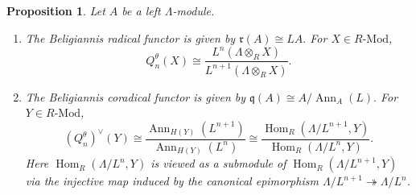 \documentclass[11pt,reqno]{amsart}
\numberwithin{equation}{section}
\newtheorem{proposition}[theorem]{Proposition}
\newcommand{\Hom}{\operatorname{Hom}}
\newcommand{\radf}{\mathfrak r}
\newcommand{\coradf}{\mathfrak q}
\newcommand{\Ann}{\operatorname{Ann}}
\begin{document}
\begin{proposition}\label{prop:theta-layers}
Let $A$ be a left $\Lambda$-module.
\begin{enumerate}[label=\textup{(\arabic*)}]
\item The Beligiannis radical functor is given by
$
\radf(A)\cong LA.
$
For $X\in R\text{-Mod}$,
\[
Q_n^\theta(X)
\cong
\frac{L^n(\Lambda\otimes_RX)}{L^{n+1}(\Lambda\otimes_RX)}.
\]

\item The Beligiannis coradical functor is given by
$
\coradf(A)\cong A/\Ann_A(L).
$
For $Y\in R\text{-Mod}$,
\[
(Q_n^\theta)^\vee(Y)
\cong
\frac{\Ann_{H(Y)}(L^{n+1})}{\Ann_{H(Y)}(L^n)}
\cong
\frac{\Hom_R(\Lambda/L^{n+1},Y)}
     {\Hom_R(\Lambda/L^n,Y)}.
\]
Here $\Hom_R(\Lambda/L^n,Y)$ is viewed as a submodule of $\Hom_R(\Lambda/L^{n+1},Y)$ via the injective map induced by the canonical epimorphism
\(\Lambda/L^{n+1}\twoheadrightarrow\Lambda/L^n\).
\end{enumerate}
\end{proposition}
\end{document}
